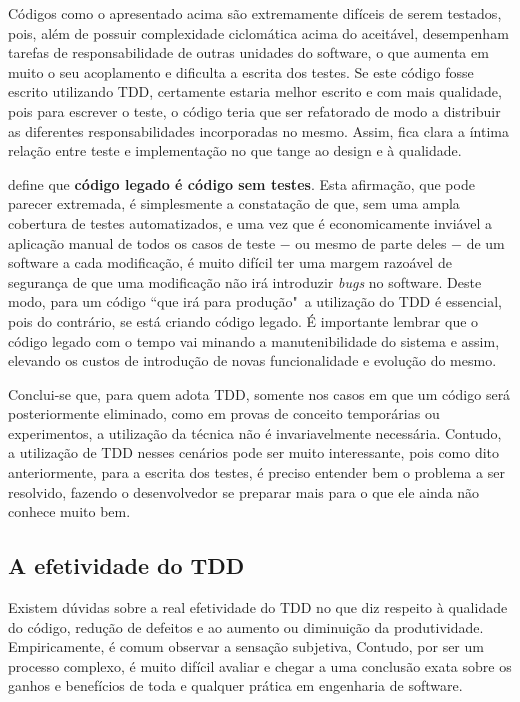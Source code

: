 Códigos como o apresentado acima são extremamente difíceis de serem testados, pois, além de possuir complexidade ciclomática acima do aceitável, desempenham tarefas de responsabilidade de outras unidades do software, o que aumenta em muito o seu acoplamento e dificulta a escrita dos testes. Se este código fosse escrito utilizando TDD, certamente estaria melhor escrito e com mais qualidade, pois para escrever o teste, o código teria que ser refatorado de modo a distribuir as diferentes responsabilidades incorporadas no mesmo. Assim, fica clara a íntima relação entre teste e implementação no que tange ao design e à qualidade.

 define que \textbf{código legado é código sem testes}. Esta afirmação, que pode parecer extremada, é simplesmente a constatação de que, sem uma ampla cobertura de testes automatizados, e uma vez que é economicamente inviável a aplicação manual de todos os casos de teste $-$ ou mesmo de parte deles $-$ de um software a cada modificação, é muito difícil ter uma margem razoável de segurança de que uma modificação não irá introduzir \textit{bugs} no software. Deste modo, para um código ``que irá para produção"\ a utilização do TDD é essencial, pois do contrário, se está criando código legado. É importante lembrar que o código legado com o tempo vai minando a manutenibilidade do sistema e assim, elevando os custos de introdução de novas funcionalidade e evolução do mesmo.

Conclui-se que, para quem adota TDD, somente nos casos em que um código será posteriormente eliminado, como em provas de conceito temporárias ou experimentos, a utilização da técnica não é invariavelmente necessária. Contudo, a utilização de TDD nesses cenários pode ser muito interessante, pois como dito anteriormente, para a escrita dos testes, é preciso entender bem o problema a ser resolvido, fazendo o desenvolvedor se preparar mais para o que ele ainda não conhece muito bem.


\subsection{A efetividade do TDD}
\label{sub:a_efetividade_do_tdd}

Existem dúvidas sobre a real efetividade do TDD no que diz respeito à qualidade do código, redução de defeitos e ao aumento ou diminuição da produtividade. Empiricamente, é comum observar a sensação subjetiva,  Contudo, por ser um processo complexo, é muito difícil avaliar e chegar a uma conclusão exata sobre os ganhos e benefícios de toda e qualquer prática em engenharia de software.

